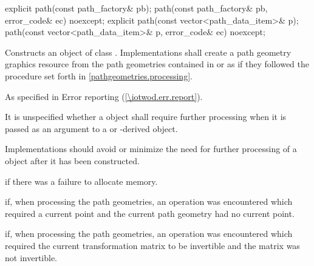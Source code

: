 \begin{itemdecl}
    explicit path(const path_factory& pb);
    path(const path_factory& pb, error_code& ec) noexcept;
    explicit path(const vector<path_data_item>& p);
    path(const vector<path_data_item>& p, error_code& ec) noexcept;
\end{itemdecl}
\begin{itemdescr}
	\pnum
	\effects
	Constructs an object of class . Implementations shall create a path geometry graphics resource from the path geometries contained in  or  as if they followed the procedure set forth in \ref{pathgeometries.processing}.

	\pnum
	\throws
	As specified in Error reporting (\ref{\iotwod.err.report}).

	\pnum
	\remarks
	It is unspecified whether a  object shall require further processing when it is passed as an argument to a  or -derived object.
	
	\pnum
	Implementations should avoid or minimize the need for further processing of a  object after it has been constructed.

	\pnum
	\errors
	 if there was a failure to allocate memory.
	
	\pnum
	 if, when processing the path geometries, an operation was encountered which required a current point and the current path geometry had no current point.
	
	\pnum
	 if, when processing the path geometries, an operation was encountered which required the current transformation matrix to be invertible and the matrix was not invertible.
	
\end{itemdescr}
